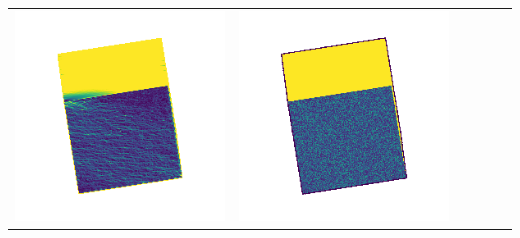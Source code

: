 \begin{tabularx}{\linewidth}{@{}Y@{}Y@{}Y@{}Y@{}Y@{}Y@{}}
\includegraphics[width=\linewidth]{semisynthetic/20160617_0_yu_err.png} &
\includegraphics[width=\linewidth]{semisynthetic/20160617_0_dpsn_err.png} &

\end{tabularx}
